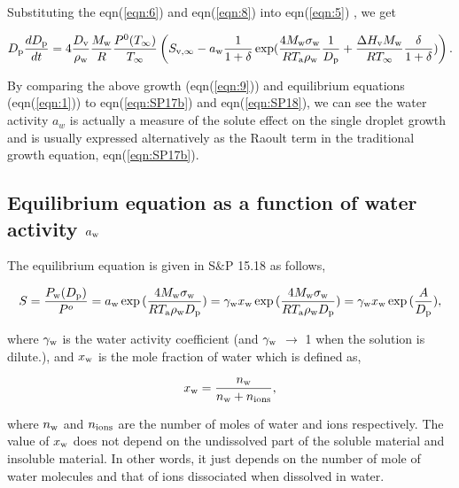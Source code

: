 \documentclass[12pt]{article}
\begin{document}
Substituting the eqn(\ref{eqn:6}) and eqn(\ref{eqn:8}) into eqn(\ref{eqn:5}) , we get

\begin{equation}\label{eqn:9}
D_{\rm p}\frac{dD_{\rm p}}{dt}=4 \frac{D_{\rm v}} {\rho_{\rm w}} \frac{M_{\rm w}}{R} \frac{P^{\rm 0}(T_{\infty})} {T_{\infty}} \left(S_{\rm v, \infty} - a_{\rm w} \frac{1}{1+\delta} \exp(\frac{4 M_{\rm w}\sigma_{\rm w}}{R T_{\rm a} \rho_{\rm w}}\frac{1}{D_{\rm p}}+\frac{\Delta H_{\rm v} M_{\rm w}}{R T_{\infty}} \frac{\delta}{1+\delta})\right).
\end{equation}

By comparing the above growth (eqn(\ref{eqn:9})) and equilibrium equations (eqn(\ref{eqn:1})) to eqn(\ref{eqn:SP17b}) and eqn(\ref{eqn:SP18}), we can see the water activity $a_{w}$ is actually a measure of the solute effect on the single droplet growth and is usually expressed alternatively as the Raoult term in the traditional growth equation, eqn(\ref{eqn:SP17b}).

\subsection{Equilibrium equation as a function of water activity $a_{\rm w}$}

The equilibrium equation is given in S$\&$P 15.18 as follows, 

\begin{equation}\label{eqn:1}
S=\frac{P_{\rm w}(D_{\rm p})}{P^{o}}=a_{\rm w}\exp{(\frac{4 M_{\rm w} \sigma_{\rm w}}{R T_{\rm a} \rho_{\rm w} D_{\rm p}})}=\gamma_{\rm w}x_{\rm w}\exp{(\frac{4 M_{\rm w} \sigma_{\rm w}}{R T_{\rm a} \rho_{\rm w} D_{\rm p}})}=\gamma_{\rm w}x_{\rm w}\exp{(\frac{A}{D_{\rm p}})},
\end{equation}

where $\gamma_{\rm w}$ is the water activity coefficient (and $\gamma_{\rm w}$ $\rightarrow$ 1 when the solution is dilute.), and $x_{\rm w}$ is the mole fraction of water which is defined as,

\begin{equation}\label{eqn:3}
x_{\rm w}=\frac{n_{\rm w}}{n_{\rm w}+n_{\rm ions}},
\end{equation}

where $n_{\rm w}$ and $n_{\rm ions}$ are the number of moles of water and ions respectively.
The value of $x_{\rm w}$ does not depend on the undissolved part of the soluble material and insoluble material. In other words, it just depends on the number of mole of water molecules and that of ions dissociated when dissolved in water.
\end{document}
